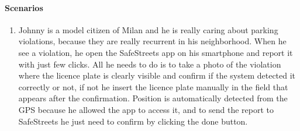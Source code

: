 \paragraph{Scenarios}
    \begin{enumerate}
        \item Johnny is a model citizen of Milan and he is really caring about parking violations, because they are really recurrent in his neighborhood. When he see a violation, he open the SafeStreets app on his smartphone and report it with just few clicks. All he needs to do is to take a photo of the violation where the licence plate is clearly visible and confirm if the system detected it correctly or not, if not he insert the licence plate manually in the field that appears after the confirmation. Position is automatically detected from the GPS because he allowed the app to access it, and to send the report to SafeStreets he just need to confirm by clicking the done button.
    \end{enumerate}

